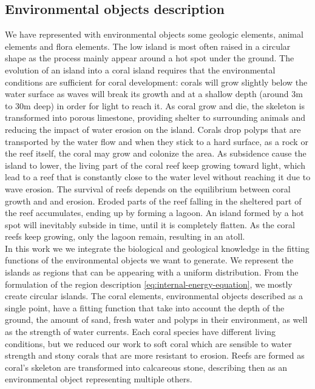 \subsection{Environmental objects description}
\label{sec:semantic-representation_represented-objects}
We have represented with environmental objects some geologic elements, animal elements and flora elements. The low island is most often raised in a circular shape as the process mainly appear around a hot spot under the ground. The evolution of an island into a coral island requires that the environmental conditions are sufficient for coral development: corals will grow slightly below the water surface as waves will break its growth and at a shallow depth (around 3m to 30m deep) in order for light to reach it. As coral grow and die, the skeleton is transformed into porous limestone, providing shelter to surrounding animals and reducing the impact of water erosion on the island. Corals drop polyps that are transported by the water flow and when they stick to a hard surface, as a rock or the reef itself, the coral may grow and colonize the area. As subsidence cause the island to lower, the living part of the coral reef keep growing toward light, which lead to a reef that is constantly close to the water level without reaching it due to wave erosion. The survival of reefs depends on the equilibrium between coral growth and and erosion. Eroded parts of the reef falling in the sheltered part of the reef accumulates, ending up by forming a lagoon. An island formed by a hot spot will inevitably subside in time, until it is completely flatten. As the coral reefs keep growing, only the lagoon remain, resulting in an atoll. \\
In this work we we integrate the biological and geological knowledge in the fitting functions of the environmental objects we want to generate. We represent the islands as regions that can be appearing with a uniform distribution. From the formulation of the region description \eqref{eq:internal-energy-equation}, we mostly create circular islands. The coral elements, environmental objects described as a single point, have a fitting function that take into account the depth of the ground, the amount of sand, fresh water and polyps in their environment, as well as the strength of water currents. Each coral species have different living conditions, but we reduced our work to soft coral which are sensible to water strength and stony corals that are more resistant to erosion. Reefs are formed as coral's skeleton are transformed into calcareous stone, describing then as an environmental object representing multiple others. 

